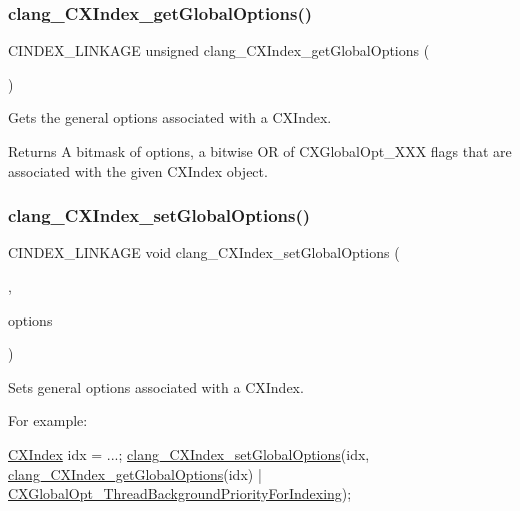 \subsubsection{\texorpdfstring{clang\+\_\+\+C\+X\+Index\+\_\+get\+Global\+Options()}{clang\_CXIndex\_getGlobalOptions()}}
{\footnotesize\ttfamily C\+I\+N\+D\+E\+X\+\_\+\+L\+I\+N\+K\+A\+GE unsigned clang\+\_\+\+C\+X\+Index\+\_\+get\+Global\+Options (\begin{DoxyParamCaption}\item[{\mbox{\hyperlink{group__CINDEX_gae039c2574bfd75774ca7a9a3e55910cb}{C\+X\+Index}}}]{ }\end{DoxyParamCaption})}



Gets the general options associated with a C\+X\+Index. 

\begin{DoxyReturn}{Returns}
A bitmask of options, a bitwise OR of C\+X\+Global\+Opt\+\_\+\+X\+XX flags that are associated with the given C\+X\+Index object. 
\end{DoxyReturn}
\mbox{\label{group__CINDEX_ga82c320cc4c21dfd64650b3995cb5e7a6}} 
\subsubsection{\texorpdfstring{clang\+\_\+\+C\+X\+Index\+\_\+set\+Global\+Options()}{clang\_CXIndex\_setGlobalOptions()}}
{\footnotesize\ttfamily C\+I\+N\+D\+E\+X\+\_\+\+L\+I\+N\+K\+A\+GE void clang\+\_\+\+C\+X\+Index\+\_\+set\+Global\+Options (\begin{DoxyParamCaption}\item[{\mbox{\hyperlink{group__CINDEX_gae039c2574bfd75774ca7a9a3e55910cb}{C\+X\+Index}}}]{,  }\item[{unsigned}]{options }\end{DoxyParamCaption})}



Sets general options associated with a C\+X\+Index. 

For example\+: 
\begin{DoxyCode}
\mbox{\hyperlink{group__CINDEX_gae039c2574bfd75774ca7a9a3e55910cb}{CXIndex}} idx = ...;
\mbox{\hyperlink{group__CINDEX_ga82c320cc4c21dfd64650b3995cb5e7a6}{clang\_CXIndex\_setGlobalOptions}}(idx,
    \mbox{\hyperlink{group__CINDEX_ga21e96379358f2aedc56890f9a35d4125}{clang\_CXIndex\_getGlobalOptions}}(idx) |
    \mbox{\hyperlink{group__CINDEX_gga1b451634928d6bcc961bf72a40e4d035aba7b16ae973f035cd4156eeae579e47a}{CXGlobalOpt\_ThreadBackgroundPriorityForIndexing}});
\end{DoxyCode}



